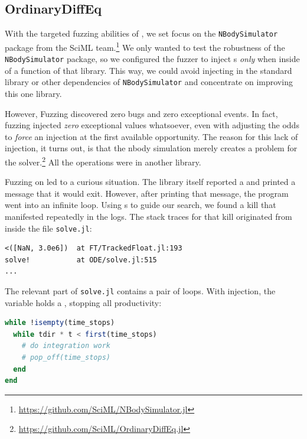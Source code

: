 \documentclass{juliacon}
\begin{document}
\subsection{OrdinaryDiffEq}
\label{s:ode}

With the targeted fuzzing abilities of \FT{}, we set focus on the
\texttt{NBodySimulator} package from the SciML
team.\footnote{\url{https://github.com/SciML/NBodySimulator.jl}}
We only wanted to test the robustness of the \texttt{NBodySimulator} package, so we configured the fuzzer to inject \NaN{}s \emph{only} when inside of a function of that library.
This way, we could avoid injecting in the standard library or other dependencies of \texttt{NBodySimulator} and concentrate on improving this one library.

However, Fuzzing discovered zero bugs and zero exceptional events.
In fact, fuzzing injected \emph{zero} exceptional values whatsoever, even with adjusting the odds to \emph{force} an injection at the first available opportunity.
The reason for this lack of \NaN{} injection, it turns out, is that the nbody
simulation merely creates a problem for the 
solver.\footnote{\url{https://github.com/SciML/OrdinaryDiffEq.jl}}
All the \fp{} operations were in another library.

Fuzzing on  led to a curious situation.
The library itself reported a \NaN{} and printed a message that it would exit.
However, after printing that message, the program went into an infinite loop.
Using \CSTG{}s to guide our search, we found a \NaN{} kill that manifested repeatedly in the logs.
The stack traces for that kill originated from inside the file \texttt{solve.jl}:

\begin{lstlisting}
<([NaN, 3.0e6])  at FT/TrackedFloat.jl:193
solve!           at ODE/solve.jl:515
...
\end{lstlisting}

The relevant part of \texttt{solve.jl} contains a pair of loops.
With injection, the variable  holds a \NaN{},
stopping all productivity:


\begin{lstlisting}[language = Julia]
while !isempty(time_stops)
  while tdir * t < first(time_stops)
    # do integration work
    # pop_off(time_stops)
  end
end
\end{lstlisting}
\end{document}
